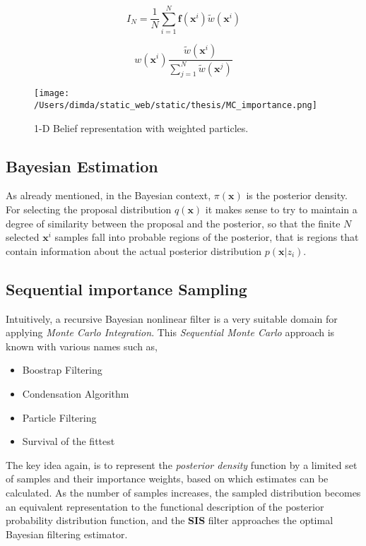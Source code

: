 \begin{equation}\label{eq:MCSM}
	I_N = \frac{1}{N} \sum_{i=1}^{N} \mathbf{f}(\mathbf{x}^i) \tilde{w}(\mathbf{x}^i)
\end{equation}



\begin{equation}\label{eq:weight_normalize}
w(\mathbf{x}^i)  \frac{\tilde{w}(\mathbf{x}^i)}{\sum_{j=1}^N \tilde{w}(\mathbf{x}^j)}
\end{equation}

\begin{figure}[H]
	\centering
	\texttt{[image: /Users/dimda/static\_web/static/thesis/MC\_importance.png]}
	\caption{1-D Belief representation with weighted particles\cite{Rao2013}.}
	\label{fig:1d_belief}
\end{figure}

\subsection{Bayesian Estimation}

As already mentioned, in the Bayesian context, $\pi (\mathbf{x})$ is the posterior density. For selecting the proposal distribution $q(\mathbf{x})$ it makes sense to try to maintain a degree of similarity between the proposal and the posterior, so that the finite $N$ selected $\mathbf{x}^i$ samples fall into probable regions of the posterior, that is regions that contain information about the actual posterior distribution $p(\mathbf{x} | z_i)$.
\subsection{Sequential importance Sampling}


Intuitively, a recursive Bayesian nonlinear filter is a very suitable domain for applying \emph{Monte Carlo Integration}. This \emph{Sequential Monte Carlo} approach is known with various names\cite{Ristic2004} such as,

\begin{itemize}
	\item Boostrap Filtering
	\item Condensation Algorithm
	\item Particle Filtering
	\item Survival of the fittest
\end{itemize}

The key idea again, is to represent the \emph{posterior density} function by a limited set of samples and their importance weights, based on which estimates can be calculated. As the number of samples increases, the sampled distribution becomes an equivalent representation to the functional description of the posterior probability distribution function, and the \textbf{SIS} filter approaches the optimal Bayesian filtering estimator\cite{Ristic2004}.


